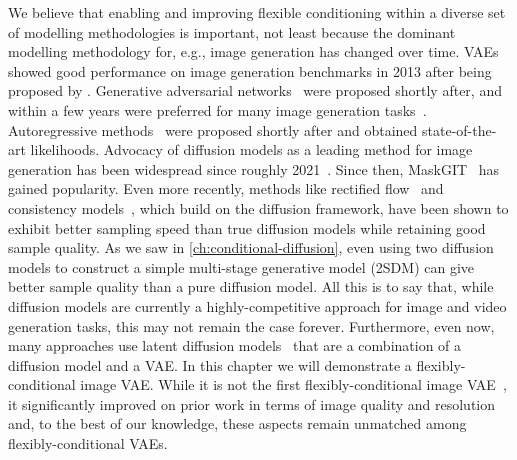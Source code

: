 We believe that enabling and improving flexible conditioning within a diverse set of modelling methodologies is important, not least because the dominant modelling methodology for, e.g., image generation has changed over time. VAEs showed good performance on image generation benchmarks in 2013 after being proposed by \citet{kingma2013auto}. Generative adversarial networks~\citep{goodfellow2014generative} were proposed shortly after, and within a few years were preferred for many image generation tasks~\citep{karras2018style}. Autoregressive methods~\citep{van2016pixel} were proposed shortly after and obtained state-of-the-art likelihoods. Advocacy of diffusion models as a leading method for image generation has been widespread since roughly 2021~\citep{dhariwal2021diffusion}. Since then, MaskGIT~\citep{chang2022maskgit} has gained popularity. Even more recently, methods like rectified flow~\citep{esser2024scaling} and consistency models~\citep{song2023consistency}, which build on the diffusion framework, have been shown to exhibit better sampling speed than true diffusion models while retaining good sample quality. As we saw in \cref{ch:conditional-diffusion}, even using two diffusion models to construct a simple multi-stage generative model (2SDM) can give better sample quality than a pure diffusion model. All this is to say that, while diffusion models are currently a highly-competitive approach for image and video generation tasks, this may not remain the case forever. Furthermore, even now, many approaches use latent diffusion models~\citep{rombach2022high,betker2023improving,brooks2024video} that are a combination of a diffusion model and a VAE. In this chapter we will demonstrate a flexibly-conditional image VAE. While it is not the first flexibly-conditional image VAE~\citep{ivanov2018variational}, it significantly improved on prior work in terms of image quality and resolution and, to the best of our knowledge, these aspects remain unmatched among flexibly-conditional VAEs.



